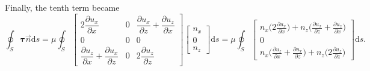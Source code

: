 \documentclass[wes, manuscript]{copernicus}
\begin{document}
Finally, the tenth term became
%
\begin{equation}
\oint_S \boldsymbol{\tau} \vec{n} \textrm{d}s
= \mu \!\oint_S
\begin{bmatrix}
2 \dfrac{\partial u_{x}}{\partial x} & 0 & \dfrac{\partial u_{x}}{\partial z} + \dfrac{\partial u_{z}}{\partial x} \\
0 & 0 & 0 \\
\dfrac{\partial u_{z}}{\partial x} + \dfrac{\partial u_{x}}{\partial z} & 0 & 2 \dfrac{\partial u_{z}}{\partial z}
\end{bmatrix}
\begin{bmatrix} n_{x} \\ 0 \\ n_{z} \end{bmatrix}\textrm{d}s
= \mu \!\oint_S
\begin{bmatrix}
n_{x} \big(2 \tfrac{\partial u_{x}}{\partial x}\big) + n_{z} \big(\tfrac{\partial u_{x}}{\partial z} + \tfrac{\partial u_{z}}{\partial x}\big) \\[6pt]
0 \\[6pt]
n_{x} \big(\tfrac{\partial u_{z}}{\partial x} + \tfrac{\partial u_{x}}{\partial z}\big) + n_{z} \big(2 \tfrac{\partial u_{z}}{\partial z}\big)
\end{bmatrix}\textrm{d}s .
\end{equation}
%
\end{document}
